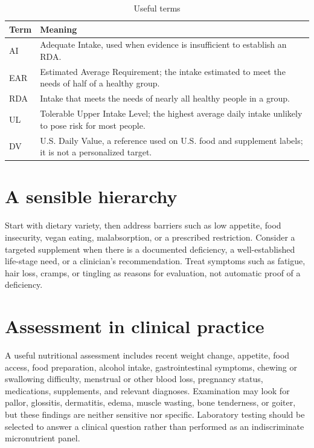 \begin{table}[ht]
\centering
\caption{Useful terms}
\begin{tabular}{p{}p{}}
\toprule
Term & Meaning \\
\midrule
AI & Adequate Intake, used when evidence is insufficient to establish an RDA. \cite{nap}\\
EAR & Estimated Average Requirement; the intake estimated to meet the needs of half of a healthy group. \cite{nap}\\
RDA & Intake that meets the needs of nearly all healthy people in a group. \cite{nap}\\
UL & Tolerable Upper Intake Level; the highest average daily intake unlikely to pose risk for most people. \cite{nap}\\
DV & U.S. Daily Value, a reference used on U.S. food and supplement labels; it is not a personalized target. \cite{fdaDV}\\
\bottomrule
\end{tabular}
\end{table}

\section{A sensible hierarchy}
Start with dietary variety, then address barriers such as low appetite, food insecurity, vegan eating, malabsorption, or a prescribed restriction. Consider a targeted supplement when there is a documented deficiency, a well-established life-stage need, or a clinician's recommendation. Treat symptoms such as fatigue, hair loss, cramps, or tingling as reasons for evaluation, not automatic proof of a deficiency.

\section{Assessment in clinical practice}
A useful nutritional assessment includes recent weight change, appetite, food access, food preparation, alcohol intake, gastrointestinal symptoms, chewing or swallowing difficulty, menstrual or other blood loss, pregnancy status, medications, supplements, and relevant diagnoses. Examination may look for pallor, glossitis, dermatitis, edema, muscle wasting, bone tenderness, or goiter, but these findings are neither sensitive nor specific. Laboratory testing should be selected to answer a clinical question rather than performed as an indiscriminate micronutrient panel. \cite{aspenAssessment}

